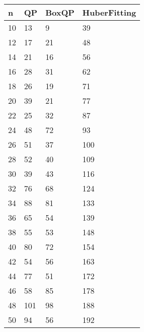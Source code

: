 \begin{tabular}{llll}
n & QP & BoxQP & HuberFitting \\ 
\hline 
10 & 13 & 9 & 39 \\ 
12 & 17 & 21 & 48 \\ 
14 & 21 & 16 & 56 \\ 
16 & 28 & 31 & 62 \\ 
18 & 26 & 19 & 71 \\ 
20 & 39 & 21 & 77 \\ 
22 & 25 & 32 & 87 \\ 
24 & 48 & 72 & 93 \\ 
26 & 51 & 37 & 100 \\ 
28 & 52 & 40 & 109 \\ 
30 & 39 & 43 & 116 \\ 
32 & 76 & 68 & 124 \\ 
34 & 88 & 81 & 133 \\ 
36 & 65 & 54 & 139 \\ 
38 & 55 & 53 & 148 \\ 
40 & 80 & 72 & 154 \\ 
42 & 54 & 56 & 163 \\ 
44 & 77 & 51 & 172 \\ 
46 & 58 & 85 & 178 \\ 
48 & 101 & 98 & 188 \\ 
50 & 94 & 56 & 192 \\ 
\hline 
\end{tabular}